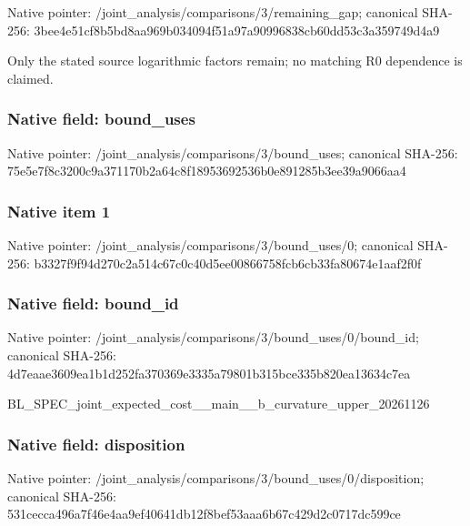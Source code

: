 \documentclass[10pt,a4paper]{article}
\begin{document}
Native pointer: /joint\_analysis/comparis\allowbreak{}ons/3/remaining\_gap; canonical SHA-256: 3bee4e51cf8b5bd8aa969b03\allowbreak{}4094f51a97a90996838cb60d\allowbreak{}d53c3a359749d4a9


Only the stated source logarithmic factors remain; no matching R0 dependence is claimed.


\subsubsection{Native field: bound\_uses}


Native pointer: /joint\_analysis/comparis\allowbreak{}ons/3/bound\_uses; canonical SHA-256: 75e5e7f8c3200c9a371170b2\allowbreak{}a64c8f18953692536b0e8912\allowbreak{}85b3ee39a9066aa4



\subsubsection{Native item 1}


Native pointer: /joint\_analysis/comparis\allowbreak{}ons/3/bound\_uses/0; canonical SHA-256: b3327f9f94d270c2a514c67c\allowbreak{}0c40d5ee00866758fcb6cb33\allowbreak{}fa80674e1aaf2f0f



\subsubsection{Native field: bound\_id}


Native pointer: /joint\_analysis/comparis\allowbreak{}ons/3/bound\_uses/0/bound\allowbreak{}\_id; canonical SHA-256: 4d7eaae3609ea1b1d252fa37\allowbreak{}0369e3335a79801b315bce33\allowbreak{}5b820ea13634c7ea


BL\_SPEC\_joint\_expected\_c\allowbreak{}ost\_\_main\_\_b\_curvature\_u\allowbreak{}pper\_20261126


\subsubsection{Native field: disposition}


Native pointer: /joint\_analysis/comparis\allowbreak{}ons/3/bound\_uses/0/dispo\allowbreak{}sition; canonical SHA-256: 531cecca496a7f46e4aa9ef4\allowbreak{}0641db12f8bef53aaa6b67c4\allowbreak{}29d2c0717dc599ce
\end{document}
